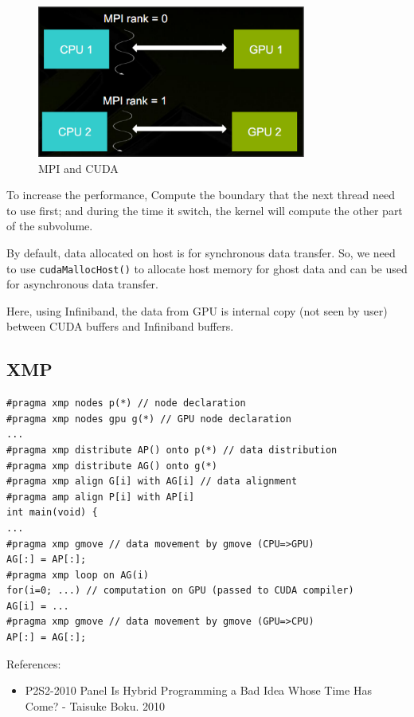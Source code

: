 \begin{figure}[hbt]
  \centerline{\includegraphics[height=5cm,
    angle=0]{./images/MPI_GPU.eps}}
\caption{MPI and CUDA}
\label{fig:MPI_GPU}
\end{figure}


To increase the performance, Compute the boundary that the next thread
need to use first; and during the time it switch, the kernel will
compute the other part of the subvolume.

By default, data allocated on host is for synchronous data
transfer. So, we need to use \verb!cudaMallocHost()! to allocate host
memory for ghost data and can be used for asynchronous data transfer.


Here, using Infiniband, the data from GPU is internal copy (not seen
by user) between CUDA buffers and Infiniband buffers.

\subsection{XMP}
\label{sec:GPUs_XMP}

\begin{verbatim}
#pragma xmp nodes p(*) // node declaration
#pragma xmp nodes gpu g(*) // GPU node declaration
...
#pragma xmp distribute AP() onto p(*) // data distribution
#pragma xmp distribute AG() onto g(*)
#pragma xmp align G[i] with AG[i] // data alignment
#pragma amp align P[i] with AP[i]
int main(void) {
...
#pragma xmp gmove // data movement by gmove (CPU=>GPU)
AG[:] = AP[:];
#pragma xmp loop on AG(i)
for(i=0; ...) // computation on GPU (passed to CUDA compiler)
AG[i] = ...
#pragma xmp gmove // data movement by gmove (GPU=>CPU)
AP[:] = AG[:];
\end{verbatim}

References:
\begin{itemize}
\item P2S2-2010 Panel Is Hybrid Programming a Bad Idea Whose Time Has
  Come? - Taisuke Boku. 2010
\end{itemize}

